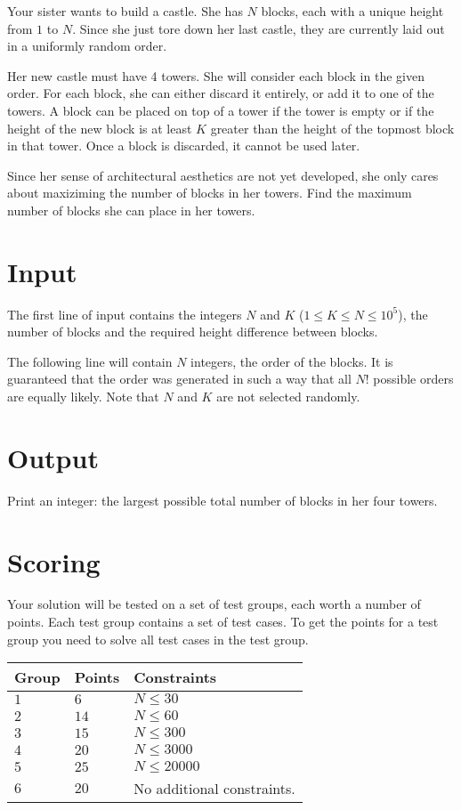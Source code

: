 \noindent

Your sister wants to build a castle. She has $N$ blocks, each with a unique
height from $1$ to $N$. Since she just tore down her last castle, they are currently 
laid out in a uniformly random order.

Her new castle must have 4 towers. She will consider each block in the 
given order. For each block, she can either discard it entirely, or add
it to one of the towers. A block can be placed on top of a tower if the tower is empty or
if the height of the new block is at least $K$ greater than the height of the topmost
block in that tower. Once a block is discarded, it cannot be used
later.

Since her sense of architectural aesthetics are not yet developed, she only
cares about maxiziming the number of blocks in her towers. Find the maximum
number of blocks she can place in her towers.

\section*{Input}
The first line of input contains the integers $N$ and $K$ ($1 \leq K \leq N \leq 10^5$),
the number of blocks and the required height difference between blocks.

The following line will contain $N$ integers, the order of the blocks. It is guaranteed
that the order was generated in such a way that all $N!$ possible orders are equally likely.
Note that $N$ and $K$ are not selected randomly.

\section*{Output}
Print an integer: the largest possible total number of blocks in her four towers.


\section*{Scoring}
Your solution will be tested on a set of test groups, each worth a number of points. Each test group contains
a set of test cases. To get the points for a test group you need to solve all test cases in the test group.

\noindent
\begin{tabular}{| l | l | p{12cm} |}
  \hline
  \textbf{Group} & \textbf{Points} & \textbf{Constraints} \\ \hline
  $1$    & $6$        & $N \leq 30$ \\ \hline
  $2$    & $14$       & $N \leq 60$ \\ \hline
  $3$    & $15$       & $N \leq 300$ \\ \hline
  $4$    & $20$       & $N \leq 3000$ \\ \hline
  $5$    & $25$       & $N \leq 20000$ \\ \hline
  $6$    & $20$       & No additional constraints. \\ \hline
\end{tabular}

